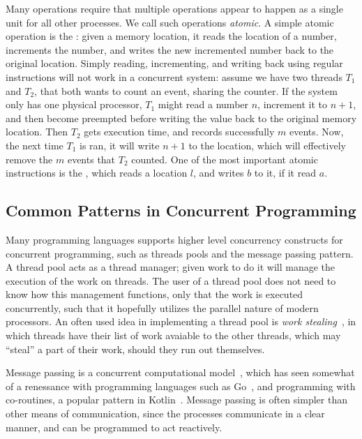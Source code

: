 Many operations require that multiple operations appear to happen as a single unit for all other
processes. We call such operations \emph{atomic}. A simple atomic operation is the
: given a memory location, it reads the location of a number, increments the
number, and writes the new incremented number back to the original location.  Simply reading,
incrementing, and writing back using regular instructions will not work in a concurrent system:
assume we have two threads $T_1$ and $T_2$, that both wants to count an event, sharing the counter.
If the system only has one physical processor, $T_1$ might read a number $n$, increment it to
$n+1$, and then become preempted before writing the value back to the original memory location.
Then $T_2$ gets execution time, and records successfully $m$ events. Now, the next time $T_1$ is
ran, it will write $n+1$ to the location, which will effectively remove the $m$ events that $T_2$
counted. One of the most important atomic instructions is the ,
which reads a location $l$, and writes $b$ to it, if it read $a$.

\subsection{Common Patterns in Concurrent Programming\label{sec:common-patterns}}

Many programming languages supports higher level concurrency constructs for concurrent programming,
such as threads pools and the message passing pattern. A thread pool acts as a thread manager;
given work to do it will manage the execution of the work on threads. The user of a thread pool
does not need to know how this management functions, only that the work is executed concurrently,
such that it hopefully utilizes the parallel nature of modern processors.  An often used idea in
implementing a thread pool is \emph{work stealing}~\cite{blumofe1999scheduling}, in which threads
have their list of work avaiable to the other threads, which may ``steal'' a part of their work,
should they run out themselves.

Message passing is a concurrent computational model~\cite{hewitt1973session}, which has seen
somewhat of a renessance with programming languages such as Go~\cite{go}, and programming with
co-routines, a popular pattern in Kotlin~\cite{kotlin}. Message passing is often simpler than other
means of communication, since the processes communicate in a clear manner, and can be programmed to
act reactively.

